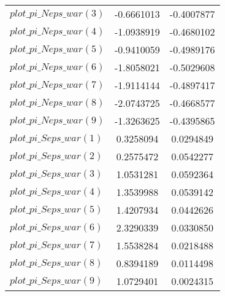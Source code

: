 \begin{center}
\begin{longtable}{lcc}
$plot\_pi\_N eps\_war (3)   $	 & 	     -0.6661013	 & 	     -0.4007877 \\ 
$plot\_pi\_N eps\_war (4)   $	 & 	     -1.0938919	 & 	     -0.4680102 \\ 
$plot\_pi\_N eps\_war (5)   $	 & 	     -0.9410059	 & 	     -0.4989176 \\ 
$plot\_pi\_N eps\_war (6)   $	 & 	     -1.8058021	 & 	     -0.5029608 \\ 
$plot\_pi\_N eps\_war (7)   $	 & 	     -1.9114144	 & 	     -0.4897417 \\ 
$plot\_pi\_N eps\_war (8)   $	 & 	     -2.0743725	 & 	     -0.4668577 \\ 
$plot\_pi\_N eps\_war (9)   $	 & 	     -1.3263625	 & 	     -0.4395865 \\ 
$plot\_pi\_S eps\_war (1)   $	 & 	      0.3258094	 & 	      0.0294849 \\ 
$plot\_pi\_S eps\_war (2)   $	 & 	      0.2575472	 & 	      0.0542277 \\ 
$plot\_pi\_S eps\_war (3)   $	 & 	      1.0531281	 & 	      0.0592364 \\ 
$plot\_pi\_S eps\_war (4)   $	 & 	      1.3539988	 & 	      0.0539142 \\ 
$plot\_pi\_S eps\_war (5)   $	 & 	      1.4207934	 & 	      0.0442626 \\ 
$plot\_pi\_S eps\_war (6)   $	 & 	      2.3290339	 & 	      0.0330850 \\ 
$plot\_pi\_S eps\_war (7)   $	 & 	      1.5538284	 & 	      0.0218488 \\ 
$plot\_pi\_S eps\_war (8)   $	 & 	      0.8394189	 & 	      0.0114498 \\ 
$plot\_pi\_S eps\_war (9)   $	 & 	      1.0729401	 & 	      0.0024315 \\ 
\end{longtable}
 \end{center}
